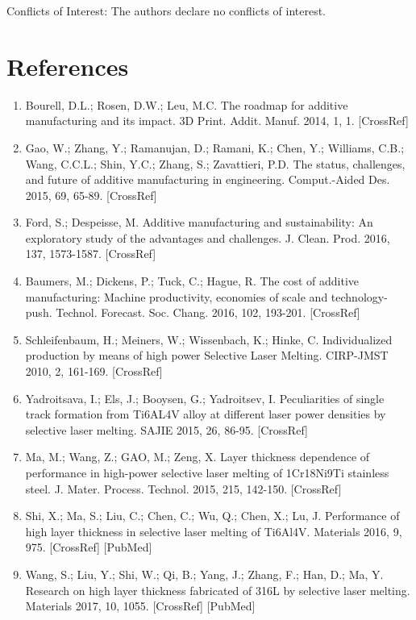\documentclass[10pt]{article}
\begin{document}
Conflicts of Interest: The authors declare no conflicts of interest.

\section*{References}
\begin{enumerate}
  \item Bourell, D.L.; Rosen, D.W.; Leu, M.C. The roadmap for additive manufacturing and its impact. 3D Print. Addit. Manuf. 2014, 1, 1. [CrossRef]

  \item Gao, W.; Zhang, Y.; Ramanujan, D.; Ramani, K.; Chen, Y.; Williams, C.B.; Wang, C.C.L.; Shin, Y.C.; Zhang, S.; Zavattieri, P.D. The status, challenges, and future of additive manufacturing in engineering. Comput.-Aided Des. 2015, 69, 65-89. [CrossRef]

  \item Ford, S.; Despeisse, M. Additive manufacturing and sustainability: An exploratory study of the advantages and challenges. J. Clean. Prod. 2016, 137, 1573-1587. [CrossRef]

  \item Baumers, M.; Dickens, P.; Tuck, C.; Hague, R. The cost of additive manufacturing: Machine productivity, economies of scale and technology-push. Technol. Forecast. Soc. Chang. 2016, 102, 193-201. [CrossRef]

  \item Schleifenbaum, H.; Meiners, W.; Wissenbach, K.; Hinke, C. Individualized production by means of high power Selective Laser Melting. CIRP-JMST 2010, 2, 161-169. [CrossRef]

  \item Yadroitsava, I.; Els, J.; Booysen, G.; Yadroitsev, I. Peculiarities of single track formation from Ti6AL4V alloy at different laser power densities by selective laser melting. SAJIE 2015, 26, 86-95. [CrossRef]

  \item Ma, M.; Wang, Z.; GAO, M.; Zeng, X. Layer thickness dependence of performance in high-power selective laser melting of 1Cr18Ni9Ti stainless steel. J. Mater. Process. Technol. 2015, 215, 142-150. [CrossRef]

  \item Shi, X.; Ma, S.; Liu, C.; Chen, C.; Wu, Q.; Chen, X.; Lu, J. Performance of high layer thickness in selective laser melting of Ti6Al4V. Materials 2016, 9, 975. [CrossRef] [PubMed]

  \item Wang, S.; Liu, Y.; Shi, W.; Qi, B.; Yang, J.; Zhang, F.; Han, D.; Ma, Y. Research on high layer thickness fabricated of 316L by selective laser melting. Materials 2017, 10, 1055. [CrossRef] [PubMed]


\end{enumerate}
\end{document}
